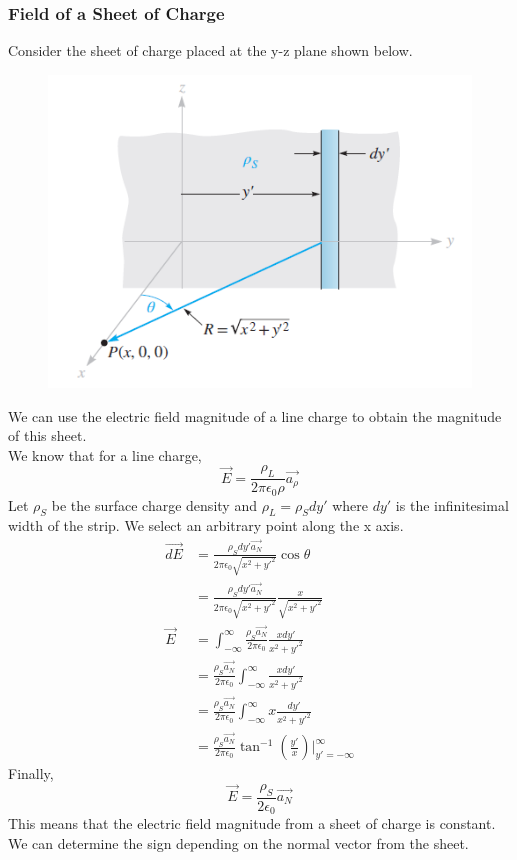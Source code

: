 \documentclass{article}
\begin{document}
\newpage 
\subsubsection{Field of a Sheet of Charge}
Consider the sheet of charge placed at the y-z plane shown below. 
\begin{figure}[H]
    \center
    \includegraphics[scale=0.55]{inf_sheet_charge}
\end{figure}
\noindent 
We can use the electric field magnitude of a line charge to obtain the magnitude of 
this sheet. 
\vspace{8pt}
\\ We know that for a line charge, 
\begin{equation*}
\vec{E} = \frac{\rho_L}{2\pi\epsilon_0\rho}\vec{a_\rho}
\end{equation*}
Let $\rho_S$ be the surface charge density and $\rho_L = \rho_S dy'$ where $dy'$ is the 
infinitesimal width of the strip. We select an arbitrary point along the x axis.   
\begin{align*}
\vec{dE} &= \frac{\rho_S dy'\vec{a_N}}{2\pi\epsilon_0\sqrt{x^2+y'^2}}\cos\theta \\
&= \frac{\rho_S dy'\vec{a_N}}{2\pi\epsilon_0\sqrt{x^2+y'^2}}\frac{x}{\sqrt{x^2+y'^2}} \\
\vec{E}&=\int_{-\infty}^{\infty}\frac{\rho_S \vec{a_N}}{2\pi\epsilon_0}\frac{xdy'}
{x^2+y'^2} \\
&= \frac{\rho_S \vec{a_N}}{2\pi\epsilon_0} \int_{-\infty}^{\infty} \frac{xdy'}
{x^2+y'^2}\\
&= \frac{\rho_S \vec{a_N}}{2\pi\epsilon_0} \int_{-\infty}^{\infty} x
\frac{dy'}{x^2+y'^2}\\
&= \frac{\rho_S \vec{a_N}}{2\pi\epsilon_0}\tan^{-1}\left(\frac{y'}{x}\right)
\Bigg|_{y'=-\infty}^{\infty}
\end{align*}
Finally,
$$\boxed{\vec{E}=\frac{\rho_S}{2\epsilon_0}\vec{a_N}}$$
This means that the electric field magnitude from a sheet of charge is constant.
We can determine the sign depending on the normal vector from the sheet. 
\end{document}
